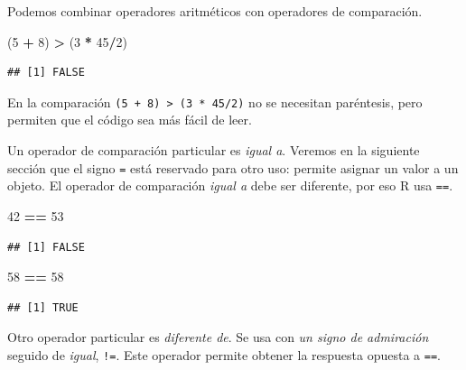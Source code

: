 \documentclass[]{book}
\makeatletter
\newenvironment{Shaded}{\begin{snugshade}}{\end{snugshade}}
\newcommand{\DecValTok}[1]{\textcolor[rgb]{0.00,0.00,0.81}{#1}}
\newcommand{\StringTok}[1]{\textcolor[rgb]{0.31,0.60,0.02}{#1}}
\newcommand{\OperatorTok}[1]{\textcolor[rgb]{0.81,0.36,0.00}{\textbf{#1}}}
\newcommand{\NormalTok}[1]{#1}
\newenvironment{kframe}{%
\medskip{}
\setlength{\fboxsep}{.8em}
 \def\at@end@of@kframe{}%
 \ifinner\ifhmode%
  \def\at@end@of@kframe{\end{minipage}}%
  \begin{minipage}{\columnwidth}%
 \fi\fi%
 \def\FrameCommand##1{\hskip\@totalleftmargin \hskip-\fboxsep
 \colorbox{shadecolor}{##1}\hskip-\fboxsep
     \hskip-\linewidth \hskip-\@totalleftmargin \hskip\columnwidth}%
 \MakeFramed {\advance\hsize-\width
   \@totalleftmargin\z@ \linewidth\hsize
   \@setminipage}}%
 {\par\unskip\endMakeFramed%
 \at@end@of@kframe}
\newenvironment{rmdblock}[1]
  {
  \begin{itemize}
  \renewcommand{\labelitemi}{
    \raisebox{-.7\height}[0pt][0pt]{
      {\setkeys{Gin}{width=3em,keepaspectratio}\texttt{[image: myIcons/\#1]}} %
    }
  }
  \setlength{\fboxsep}{1em}
  \begin{kframe}
  \item
  }
  {
  \end{kframe}
  \end{itemize}
  }
\newenvironment{rmdstyle}     %
  {\begin{rmdblock}{style}}   %
  {\end{rmdblock}}            %
\makeatother
\begin{document}
Podemos combinar operadores aritméticos con operadores de comparación.

\begin{Shaded}
\begin{Highlighting}[]
\NormalTok{(}\DecValTok{5} \OperatorTok{+}\StringTok{ }\DecValTok{8}\NormalTok{) }\OperatorTok{>}\StringTok{ }\NormalTok{(}\DecValTok{3} \OperatorTok{*}\StringTok{ }\DecValTok{45}\OperatorTok{/}\DecValTok{2}\NormalTok{) }
\end{Highlighting}
\end{Shaded}

\begin{verbatim}
## [1] FALSE
\end{verbatim}

\begin{rmdstyle}
En la comparación \texttt{(5\ +\ 8)\ \textgreater{}\ (3\ *\ 45/2)} no se
necesitan paréntesis, pero permiten que el código sea más fácil de leer.
\end{rmdstyle}

Un operador de comparación particular es \emph{igual a}. Veremos en la
siguiente sección que el signo \texttt{=} está reservado para otro uso:
permite asignar un valor a un objeto. El operador de comparación
\emph{igual a} debe ser diferente, por eso R usa \texttt{==}.

\begin{Shaded}
\begin{Highlighting}[]
\DecValTok{42} \OperatorTok{==}\StringTok{ }\DecValTok{53}
\end{Highlighting}
\end{Shaded}

\begin{verbatim}
## [1] FALSE
\end{verbatim}

\begin{Shaded}
\begin{Highlighting}[]
\DecValTok{58} \OperatorTok{==}\StringTok{ }\DecValTok{58}
\end{Highlighting}
\end{Shaded}

\begin{verbatim}
## [1] TRUE
\end{verbatim}

Otro operador particular es \emph{diferente de}. Se usa con \emph{un
signo de admiración} seguido de \emph{igual}, \texttt{!=}. Este operador
permite obtener la respuesta opuesta a \texttt{==}.
\end{document}
